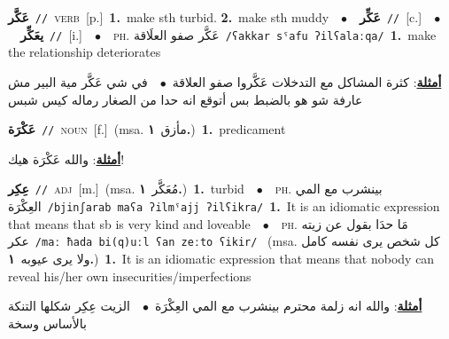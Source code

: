 \documentclass[10pt,a4paper,twoside]{article} %
\begin{document}
\begin{multicols}{2}
{\setlength\topsep{0pt}\textbf{\foreignlanguage{arabic}{عَكَّر}}\ {\color{gray}\texttt{//}\color{black}}\ \textsc{verb}\ [p.]\ \textbf{1.}~make sth turbid.  \textbf{2.}~make sth muddy\ \ $\bullet$\ \ \setlength\topsep{0pt}\textbf{\foreignlanguage{arabic}{عَكِّر}}\ {\color{gray}\texttt{//}\color{black}}\ [c.]\ \ $\bullet$\ \ \setlength\topsep{0pt}\textbf{\foreignlanguage{arabic}{يعَكِّر}}\ {\color{gray}\texttt{//}\color{black}}\ [i.]\ \ $\bullet$\ \ \textsc{ph.} \color{gray} \foreignlanguage{arabic}{عَكَّر صفو العلَاقة}\color{black}\ {\color{gray}\texttt{/{\sffamily ʕakkar sˤafu ʔilʕalaːqa}/}\color{black}}\ \textbf{1.}~make the relationship deteriorates\  \begin{flushright}\color{gray}\foreignlanguage{arabic}{\textbf{\underline{\foreignlanguage{arabic}{أمثلة}}}: كثرة المشاكل مع التدخلات عَكَّروا صفو العلاقة\ $\bullet$\ \  في شي عَكَّر مية البير مش عارفة شو هو بالضبط بس أتوقع انه حدا من الصغار رماله كيس شبس}\end{flushright}\color{black}} \vspace{2mm}

{\setlength\topsep{0pt}\textbf{\foreignlanguage{arabic}{عَكْرَة}}\ {\color{gray}\texttt{//}\color{black}}\ \textsc{noun}\ [f.]\ \color{gray}(msa. \foreignlanguage{arabic}{مأزق}~\foreignlanguage{arabic}{\textbf{١.}})\color{black}\ \textbf{1.}~predicament\  \begin{flushright}\color{gray}\foreignlanguage{arabic}{\textbf{\underline{\foreignlanguage{arabic}{أمثلة}}}: والله عَكْرَة هيك!}\end{flushright}\color{black}} \vspace{2mm}

{\setlength\topsep{0pt}\textbf{\foreignlanguage{arabic}{عِكِر}}\ {\color{gray}\texttt{//}\color{black}}\ \textsc{adj}\ [m.]\ \color{gray}(msa. \foreignlanguage{arabic}{مُعَكَّر}~\foreignlanguage{arabic}{\textbf{١.}})\color{black}\ \textbf{1.}~turbid\ \ $\bullet$\ \ \textsc{ph.} \color{gray} \foreignlanguage{arabic}{بينشرب مع المي العِكْرَة}\color{black}\ {\color{gray}\texttt{/{\sffamily bjinʃarab maʕa ʔilmˤajj ʔilʕikra}/}\color{black}}\ \textbf{1.}~It is an idiomatic expression that means that sb is very kind and loveable\ \ $\bullet$\ \ \textsc{ph.} \color{gray} \foreignlanguage{arabic}{مَا حدَا بقول عن زيته عكر}\color{black}\ {\color{gray}\texttt{/{\sffamily maː ħada bi(q)uːl ʕan zeːto ʕikir}/}\color{black}}\ \color{gray} (msa. \foreignlanguage{arabic}{كل شخص يرى نفسه كامل ولا يرى عيوبه}~\foreignlanguage{arabic}{\textbf{١.}})\color{black}\ \textbf{1.}~It is an idiomatic expression that means that nobody can reveal his/her own insecurities/imperfections\  \begin{flushright}\color{gray}\foreignlanguage{arabic}{\textbf{\underline{\foreignlanguage{arabic}{أمثلة}}}: والله انه زلمة محترم بينشرب مع المي العِكْرَة\ $\bullet$\ \  الزيت عِكِر شكلها التنكة بالأساس وسخة}\end{flushright}\color{black}} \vspace{2mm}


\end{multicols}
\end{document}
